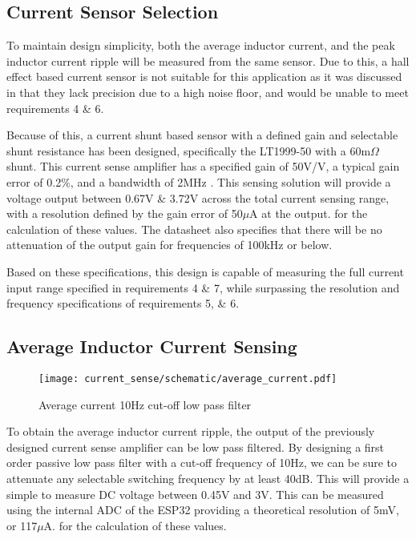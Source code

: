 \subsection{Current Sensor Selection}\label{S:current_sense_selection}

To maintain design simplicity, both the average inductor current, and the peak inductor current ripple will be measured from the same sensor. Due to this, a hall effect based current sensor is not suitable for this application as it was discussed in  that they lack precision due to a high noise floor, and would be unable to meet requirements 4 \& 6. 

Because of this, a current shunt based sensor with a defined gain and selectable shunt resistance has been designed, specifically the LT1999-50 with a 60m$\Omega$ shunt. This current sense amplifier has a specified gain of 50V/V, a typical gain error of 0.2\%, and a bandwidth of 2MHz \cite{LT1999_datasheet}. This sensing solution will provide a voltage output between 0.67V \& 3.72V across the total current sensing range, with a resolution defined by the gain error of 50$\mu$A at the output.   for the calculation of these values. The datasheet also specifies that there will be no attenuation of the output gain for frequencies of 100kHz or below. 

Based on these specifications, this design is capable of measuring the full current input range specified in requirements 4 \& 7, while surpassing the resolution and frequency specifications of requirements 5, \& 6.


\subsection{Average Inductor Current Sensing}

\begin{wrapfigure}{r}{0.3\textwidth}
    \vspace{-33pt}
    \begin{center}
      \texttt{[image: current\_sense/schematic/average\_current.pdf]}
    \end{center}
    \caption{Average current 10Hz cut-off low pass filter}
    \vspace{-22pt}
\end{wrapfigure}

To obtain the average inductor current ripple, the output of the previously designed current sense amplifier can be low pass filtered. By designing a first order passive low pass filter with a cut-off frequency of 10Hz, we can be sure to attenuate any selectable switching frequency by at least 40dB. This will provide a simple to measure DC voltage between 0.45V and 3V. This can be measured using the internal ADC of the ESP32 providing a theoretical resolution of 5mV, or 117$\mu$A.   for the calculation of these values.



